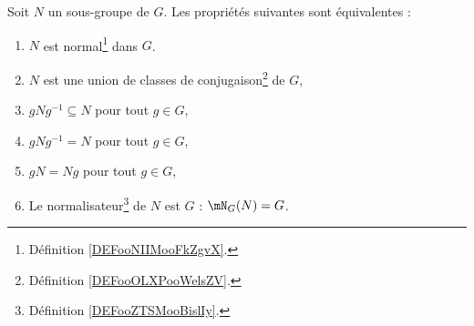 \begin{proposition}\label{propGroupeNormal}
    Soit \( N\) un sous-groupe de \( G\). Les propriétés suivantes sont équivalentes :
    \begin{enumerate}
        \item       \label{ITEMooDYEUooOuKEqQ}
            \( N\) est normal\footnote{Définition \ref{DEFooNIIMooFkZgvX}.} dans \( G\).
        \item       \label{ITEMooPYTEooZhvrUa}
            \( N\) est une union de classes de conjugaison\footnote{Définition \ref{DEFooOLXPooWelsZV}.} de \( G\),
        \item       \label{ITEMooJWTLooBRmriQ}
            \( gNg^{-1}\subseteq N\) pour tout \( g\in G\),
        \item       \label{ITEMooVRZIooAorhRY}
            \( gNg^{-1}= N\) pour tout \( g\in G\),
        \item       \label{ITEMooJGUOooYshOZa}
            \( gN=Ng\) pour tout \( g\in G\),
        \item       \label{ITEMooMRYRooZifCCe}
            Le normalisateur\footnote{Définition \ref{DEFooZTSMooBislIy}.} de \( N\) est \( G\) : \( \mN_G(N)=G\).
    \end{enumerate}
\end{proposition}

